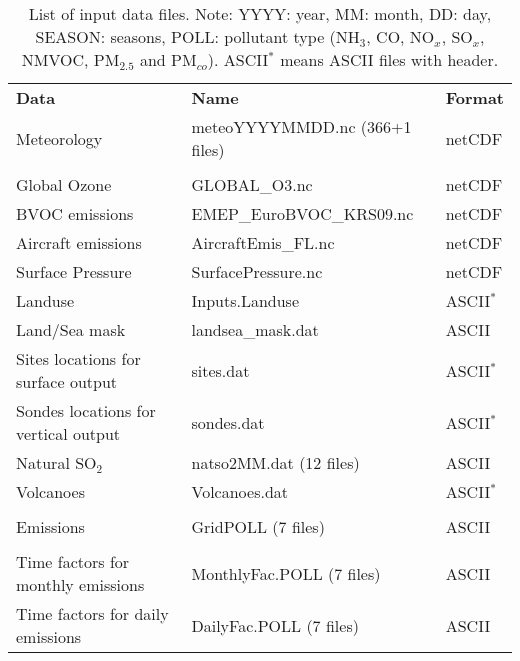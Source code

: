 \begin{table}
\caption[List of input data files]{List of input data files.
Note: YYYY: year, MM: month, DD: day, SEASON: seasons, POLL: pollutant
type (NH$_3$, CO, NO$_x$, SO$_x$, NMVOC,
PM$_{2.5}$ and PM$_{co}$). ASCII$^*$ means ASCII files with header.
\label{Tab:inputdata}}
\begin{center}
\begin{small}
\hspace{-1cm}
\begin{tabular}{lll}
 && \\
\hline
{\bf Data} &  {\bf Name} & {\bf Format}\\
\hline
Meteorology  &  meteoYYYYMMDD.nc \quad (366+1 files) & netCDF\\
& & \\
Global Ozone & GLOBAL\_O3.nc & netCDF\\
BVOC emissions & EMEP\_EuroBVOC\_KRS09.nc & netCDF\\
Aircraft emissions & AircraftEmis\_FL.nc & netCDF \\
Surface Pressure & SurfacePressure.nc & netCDF \\
Landuse & Inputs.Landuse & ASCII$^*$\\
Land/Sea mask & landsea\_mask.dat & ASCII\\
Sites locations for surface output & sites.dat & ASCII$^*$\\
Sondes locations for vertical output & sondes.dat & ASCII$^*$\\
Natural SO$_2$ & natso2MM.dat  \quad (12 files) & ASCII\\
Volcanoes & Volcanoes.dat & ASCII$^*$\\
 && \\
Emissions & GridPOLL  \quad (7 files) & ASCII\\
 && \\
Time factors for monthly emissions& MonthlyFac.POLL  \quad (7 files) & ASCII\\
Time factors for daily emissions &  DailyFac.POLL  \quad (7 files)
& ASCII\\

\end{tabular}
\end{small}
\end{center}
\end{table}
